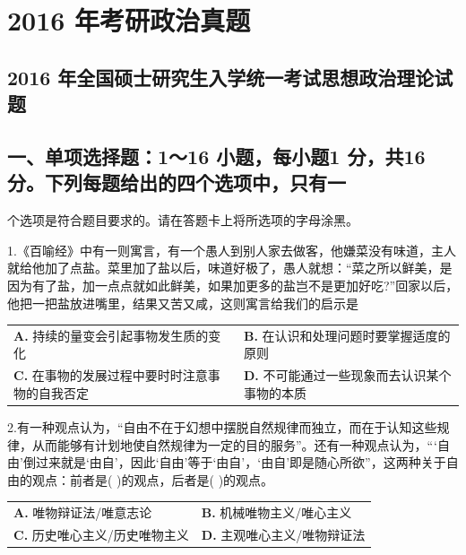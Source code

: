 \documentclass[UTF8,11pt]{ctexart}
\begin{document}
\section*{2016 年考研政治真题}
\subsection*{2016 年全国硕士研究生入学统一考试思想政治理论试题}

\subsection*{一、单项选择题：1～16 小题，每小题1 分，共16 分。下列每题给出的四个选项中，只有一}

个选项是符合题目要求的。请在答题卡上将所选项的字母涂黑。


1.《百喻经》中有一则寓言，有一个愚人到别人家去做客，他嫌菜没有味道，主人就给他加了点盐。菜里加了盐以后，味道好极了，愚人就想：“菜之所以鲜美，是因为有了盐，加一点点就如此鲜美，如果加更多的盐岂不是更加好吃?”回家以后，他把一把盐放进嘴里，结果又苦又咸，这则寓言给我们的启示是


\begin{center}\begin{tabular}{>{\raggedright\arraybackslash}p{\dimexpr(\linewidth-4\tabcolsep)/2\relax}>{\raggedright\arraybackslash}p{\dimexpr(\linewidth-4\tabcolsep)/2\relax}}
\textbf{A.} 持续的量变会引起事物发生质的变化 & \textbf{B.} 在认识和处理问题时要掌握适度的原则\\[.35em]
\textbf{C.} 在事物的发展过程中要时时注意事物的自我否定 & \textbf{D.} 不可能通过一些现象而去认识某个事物的本质\\[.35em]\end{tabular}\end{center}

2.有一种观点认为，“自由不在于幻想中摆脱自然规律而独立，而在于认知这些规律，从而能够有计划地使自然规律为一定的目的服务”。还有一种观点认为，“‘自由’倒过来就是‘由自’，因此‘自由’等于‘由自’，‘由自’即是随心所欲”，这两种关于自由的观点：前者是( )的观点，后者是( )的观点。


\begin{center}\begin{tabular}{>{\raggedright\arraybackslash}p{\dimexpr(\linewidth-4\tabcolsep)/2\relax}>{\raggedright\arraybackslash}p{\dimexpr(\linewidth-4\tabcolsep)/2\relax}}
\textbf{A.} 唯物辩证法/唯意志论 & \textbf{B.} 机械唯物主义/唯心主义\\[.35em]
\textbf{C.} 历史唯心主义/历史唯物主义 & \textbf{D.} 主观唯心主义/唯物辩证法\\[.35em]\end{tabular}\end{center}
\end{document}
